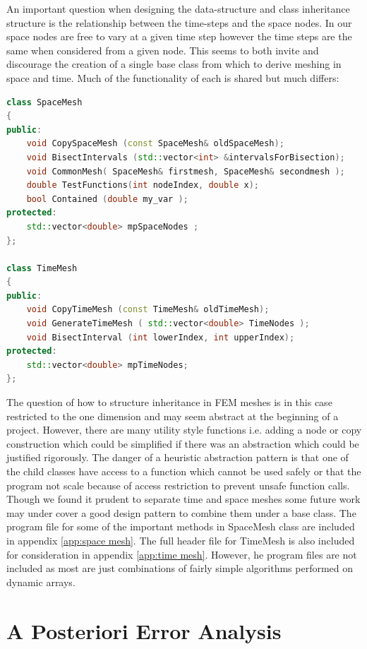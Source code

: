 \documentclass{uonmathreport}
\theoremstyle{definition}
\theoremstyle{problem}
\theoremstyle{theorem}
\begin{document}
An important question when designing the data-structure and class inheritance structure is the relationship between the time-steps and the space nodes. In our space nodes are free to vary at a given time step however the time steps are the same when considered from a given node. This seems to both invite and discourage the creation of a single base class from which to derive meshing in space and time. Much of the functionality of each is shared but much differs:

\begin{lstlisting}[language=C++]
class SpaceMesh
{
public:
    void CopySpaceMesh (const SpaceMesh& oldSpaceMesh);
    void BisectIntervals (std::vector<int> &intervalsForBisection);
    void CommonMesh( SpaceMesh& firstmesh, SpaceMesh& secondmesh );
    double TestFunctions(int nodeIndex, double x);
    bool Contained (double my_var );
protected:
    std::vector<double> mpSpaceNodes ;
};

class TimeMesh
{
public:
    void CopyTimeMesh (const TimeMesh& oldTimeMesh);
    void GenerateTimeMesh ( std::vector<double> TimeNodes );
    void BisectInterval (int lowerIndex, int upperIndex);
protected:
    std::vector<double> mpTimeNodes;
};

\end{lstlisting}

The question of how to structure inheritance in FEM meshes is in this case restricted to the one dimension and may seem abstract at the beginning of a project. However, there are many utility style functions i.e. adding a node or copy construction which could be simplified if there was an abstraction which could be justified rigorously. The danger of a heuristic abstraction pattern is that one of the child classes have access to a function which cannot be used safely or that the program not scale because of access restriction to prevent unsafe function calls. Though we found it prudent to separate time and space meshes some future work may under cover a good design pattern to combine them under a base class.
The program file for some of the important methods in SpaceMesh class are included in appendix \ref{app:space mesh}. The full header file for TimeMesh is also included for consideration in appendix \ref{app:time mesh}. However, he program files are not included as most are just combinations of fairly simple algorithms performed on dynamic arrays. 

\newpage

\section{A Posteriori Error Analysis} \label{sec:Errors}
\end{document}
